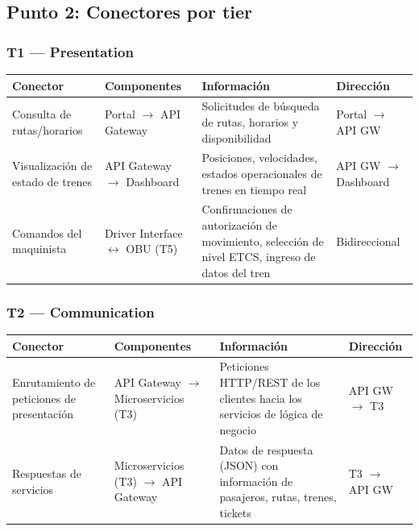 \documentclass[a4paper, 10 pt]{article}
\begin{document}
\subsection{Punto 2: Conectores por tier}

\subsubsection{T1 --- Presentation}

\begin{table}[H]
\centering
\footnotesize
\begin{tabular}{|R{0.18\textwidth}|R{0.2\textwidth}|R{0.32\textwidth}|M{0.14\textwidth}|}
\hline
\textbf{Conector} & \textbf{Componentes} & \textbf{Información} & \textbf{Dirección} \\
\hline
Consulta de rutas/horarios & Portal $\rightarrow$ API Gateway & Solicitudes de búsqueda de rutas, horarios y disponibilidad & Portal $\rightarrow$ API GW \\
\hline
Visualización de estado de trenes & API Gateway $\rightarrow$ Dashboard & Posiciones, velocidades, estados operacionales de trenes en tiempo real & API GW $\rightarrow$ Dashboard \\
\hline
Comandos del maquinista & Driver Interface $\leftrightarrow$ OBU (T5) & Confirmaciones de autorización de movimiento, selección de nivel ETCS, ingreso de datos del tren & Bidireccional \\
\hline
\end{tabular}
\end{table}

\subsubsection{T2 --- Communication}

\begin{table}[H]
\centering
\footnotesize
\begin{tabular}{|R{0.18\textwidth}|R{0.2\textwidth}|R{0.32\textwidth}|M{0.14\textwidth}|}
\hline
\textbf{Conector} & \textbf{Componentes} & \textbf{Información} & \textbf{Dirección} \\
\hline
Enrutamiento de peticiones de presentación & API Gateway $\rightarrow$ Microservicios (T3) & Peticiones HTTP/REST de los clientes hacia los servicios de lógica de negocio & API GW $\rightarrow$ T3 \\
\hline
Respuestas de servicios & Microservicios (T3) $\rightarrow$ API Gateway & Datos de respuesta (JSON) con información de pasajeros, rutas, trenes, tickets & T3 $\rightarrow$ API GW \\
\hline
\end{tabular}
\end{table}
\end{document}
